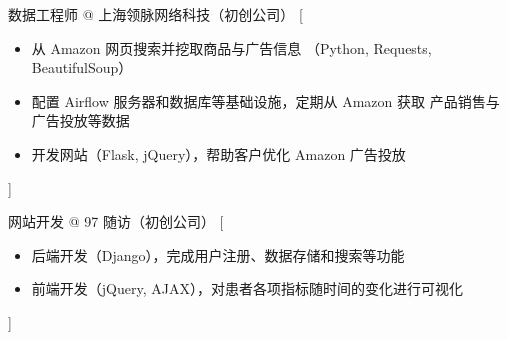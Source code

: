 \documentclass[zh]{resume}
\begin{document}
\clearpage
\begin{experiences}
    {数据工程师 @ 上海领脉网络科技（初创公司）}%
    [\begin{itemize}
      \item 从 Amazon 网页搜索并挖取商品与广告信息
        （Python, Requests, BeautifulSoup）
      \item 配置 Airflow 服务器和数据库等基础设施，定期从 Amazon 获取
        产品销售与广告投放等数据
      \item 开发网站（Flask, jQuery），帮助客户优化 Amazon 广告投放
    \end{itemize}]%

  \separator{0.5em}
    {网站开发 @ 97 随访（初创公司）}%
    [\begin{itemize}
      \item 后端开发（Django），完成用户注册、数据存储和搜索等功能
      \item 前端开发（jQuery, AJAX），对患者各项指标随时间的变化进行可视化
    \end{itemize}]%
\end{experiences}
\end{document}
